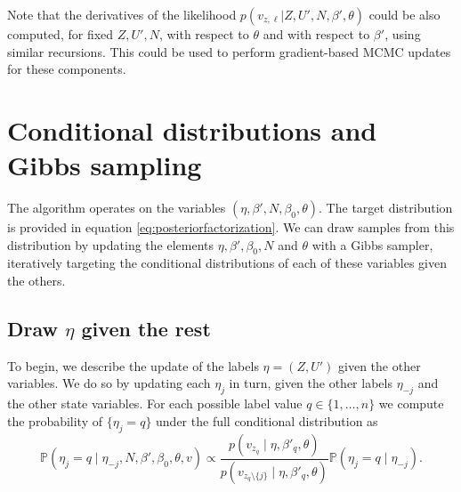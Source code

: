 \documentclass[ba]{imsart}
\begin{document}
Note that the derivatives of the likelihood 
$p(v_{z,\ell}|Z,U',N,\beta',\theta)$
could be also computed, for fixed $Z,U',N$, with respect to $\theta$
and with respect to $\beta'$, using similar recursions.
This could be used to perform gradient-based MCMC 
updates for these components.

\section{Conditional distributions and Gibbs sampling}

The algorithm operates on the variables
$(\eta, \beta', N, \beta_0, \theta)$. The target
distribution is provided in equation \eqref{eq:posteriorfactorization}. 
We can draw samples from this distribution by updating the elements 
$\eta, \beta', \beta_0,N$ and $\theta$ with a Gibbs sampler, 
iteratively targeting the conditional distributions of each of these
variables given the others.


\subsection{Draw $\eta$ given the rest}

To begin, we describe the update of the labels $\eta = (Z, U')$ given the other variables. We do so by
updating each $\eta_j$ in turn, given the other labels $\eta_{-j}$ and the other state variables.
For each possible label value $q \in \{1,\ldots,n\}$
we compute the probability of $\{\eta_j = q\}$
under the full conditional distribution as
\begin{equation}
    \label{eq:conditional_eta}
    \mathbb{P}\left(\eta_j = q \mid \eta_{-j}, N, \beta',\beta_0, \theta, v\right) \propto
    \frac{p(v_{z_q}\mid \eta, \beta'_q,\theta)}{p(v_{z_{q}\setminus\{j\}}\mid \eta, \beta'_q,\theta)}
    \mathbb{P}\left(\eta_j = q \mid \eta_{-j}\right).
\end{equation}
\end{document}
